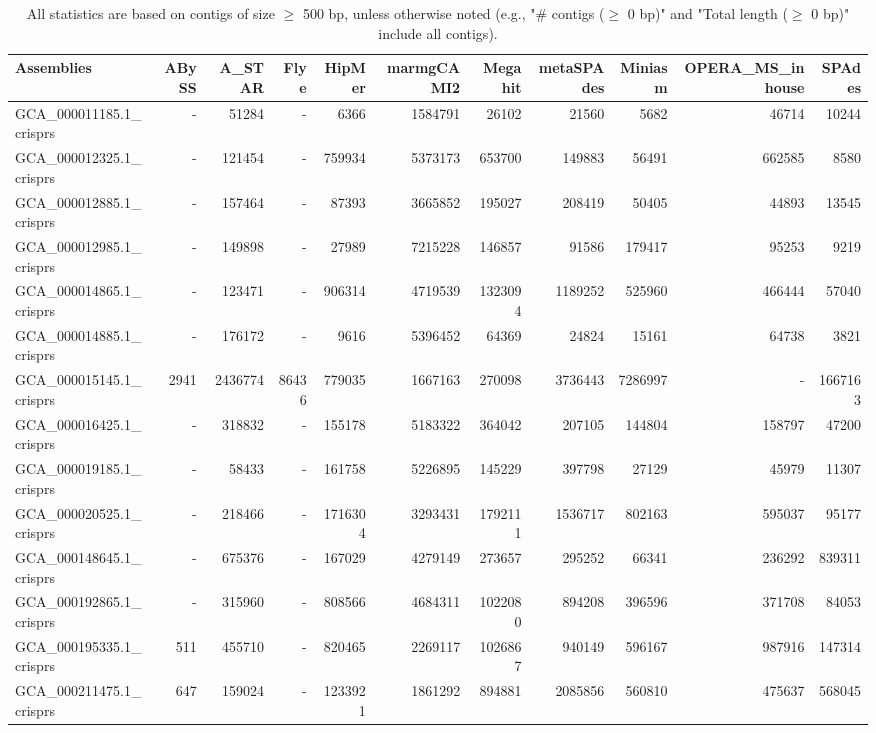 \documentclass[12pt,a4paper]{article}
\begin{document}
\begin{table}[ht]
\begin{center}
\caption{All statistics are based on contigs of size $\geq$ 500 bp, unless otherwise noted (e.g., "\# contigs ($\geq$ 0 bp)" and "Total length ($\geq$ 0 bp)" include all contigs).}
\begin{tabular}{|l*{10}{|r}|}
\hline
Assemblies & ABySS & A\_STAR & Flye & HipMer & marmgCAMI2 & Megahit & metaSPAdes & Miniasm & OPERA\_MS\_inhouse & SPAdes \\ \hline
GCA\_000011185.1\_crisprs & - & 51284 & - & 6366 & 1584791 & 26102 & 21560 & 5682 & 46714 & 10244 \\ \hline
GCA\_000012325.1\_crisprs & - & 121454 & - & 759934 & 5373173 & 653700 & 149883 & 56491 & 662585 & 8580 \\ \hline
GCA\_000012885.1\_crisprs & - & 157464 & - & 87393 & 3665852 & 195027 & 208419 & 50405 & 44893 & 13545 \\ \hline
GCA\_000012985.1\_crisprs & - & 149898 & - & 27989 & 7215228 & 146857 & 91586 & 179417 & 95253 & 9219 \\ \hline
GCA\_000014865.1\_crisprs & - & 123471 & - & 906314 & 4719539 & 1323094 & 1189252 & 525960 & 466444 & 57040 \\ \hline
GCA\_000014885.1\_crisprs & - & 176172 & - & 9616 & 5396452 & 64369 & 24824 & 15161 & 64738 & 3821 \\ \hline
GCA\_000015145.1\_crisprs & 2941 & 2436774 & 86436 & 779035 & 1667163 & 270098 & 3736443 & 7286997 & - & 1667163 \\ \hline
GCA\_000016425.1\_crisprs & - & 318832 & - & 155178 & 5183322 & 364042 & 207105 & 144804 & 158797 & 47200 \\ \hline
GCA\_000019185.1\_crisprs & - & 58433 & - & 161758 & 5226895 & 145229 & 397798 & 27129 & 45979 & 11307 \\ \hline
GCA\_000020525.1\_crisprs & - & 218466 & - & 1716304 & 3293431 & 1792111 & 1536717 & 802163 & 595037 & 95177 \\ \hline
GCA\_000148645.1\_crisprs & - & 675376 & - & 167029 & 4279149 & 273657 & 295252 & 66341 & 236292 & 839311 \\ \hline
GCA\_000192865.1\_crisprs & - & 315960 & - & 808566 & 4684311 & 1022080 & 894208 & 396596 & 371708 & 84053 \\ \hline
GCA\_000195335.1\_crisprs & 511 & 455710 & - & 820465 & 2269117 & 1026867 & 940149 & 596167 & 987916 & 147314 \\ \hline
GCA\_000211475.1\_crisprs & 647 & 159024 & - & 1233921 & 1861292 & 894881 & 2085856 & 560810 & 475637 & 568045 \\ \hline

\end{tabular}
\end{center}
\end{table}
\end{document}
